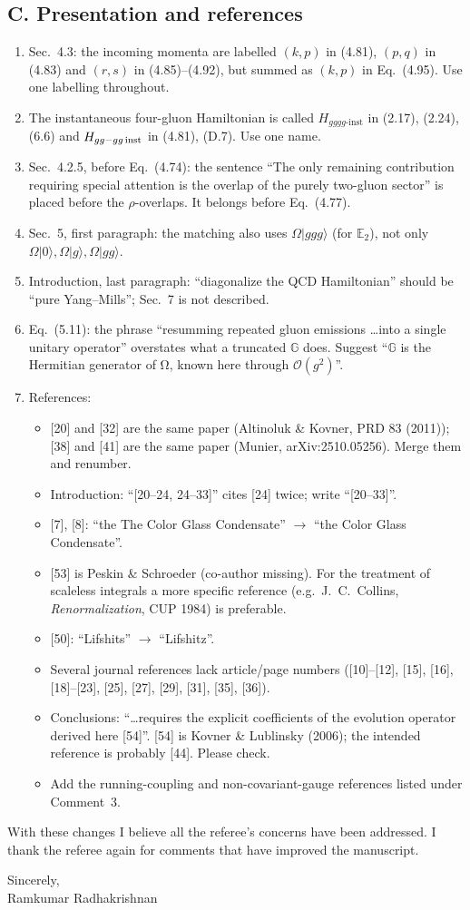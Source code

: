 \documentclass[11pt,a4paper]{article}
\newcommand{\eq}[1]{Eq.~(#1)}
\begin{document}
\subsection*{C. Presentation and references}
\begin{enumerate}[label=\textbf{C\arabic*.},leftmargin=26pt,itemsep=3pt]
\item Sec.~4.3: the incoming momenta are labelled $(k,p)$ in (4.81), $(p,q)$ in (4.83) and $(r,s)$ in (4.85)--(4.92), but summed as $(k,p)$ in \eq{4.95}. Use one labelling throughout.
\item The instantaneous four-gluon Hamiltonian is called $H_{gggg\text{-inst}}$ in (2.17), (2.24), (6.6) and $H_{gg-gg\,\rm inst}$ in (4.81), (D.7). Use one name.
\item Sec.~4.2.5, before \eq{4.74}: the sentence ``The only remaining contribution requiring special attention is the overlap of the purely two-gluon sector'' is placed before the $\rho$-overlaps. It belongs before \eq{4.77}.
\item Sec.~5, first paragraph: the matching also uses $\Omega|ggg\rangle$ (for $\mathbb E_2$), not only $\Omega|0\rangle,\Omega|g\rangle,\Omega|gg\rangle$.
\item Introduction, last paragraph: ``diagonalize the QCD Hamiltonian'' should be ``pure Yang--Mills''; Sec.~7 is not described.
\item \eq{5.11}: the phrase ``resumming repeated gluon emissions \dots into a single unitary operator'' overstates what a truncated $\mathbb G$ does. Suggest ``$\mathbb G$ is the Hermitian generator of Ω, known here through $\mathcal O(g^2)$''.
\item References:
  \begin{itemize}[itemsep=1pt]
  \item{} [20] and [32] are the same paper (Altinoluk \& Kovner, PRD 83 (2011)); [38] and [41] are the same paper (Munier, arXiv:2510.05256). Merge them and renumber.
  \item Introduction: ``[20--24, 24--33]'' cites [24] twice; write ``[20--33]''.
  \item{} [7], [8]: ``the The Color Glass Condensate'' $\to$ ``the Color Glass Condensate''.
  \item{} [53] is Peskin \& Schroeder (co-author missing). For the treatment of scaleless integrals a more specific reference (e.g.\ J.~C.~Collins, \emph{Renormalization}, CUP 1984) is preferable.
  \item{} [50]: ``Lifshits'' $\to$ ``Lifshitz''.
  \item Several journal references lack article/page numbers ([10]--[12], [15], [16], [18]--[23], [25], [27], [29], [31], [35], [36]).
  \item Conclusions: ``\dots requires the explicit coefficients of the evolution operator derived here [54]''. [54] is Kovner \& Lublinsky (2006); the intended reference is probably [44]. Please check.
  \item Add the running-coupling and non-covariant-gauge references listed under Comment~3.
  \end{itemize}
\end{enumerate}

\vspace{6pt}
\noindent With these changes I believe all the referee's concerns have been addressed. I thank the referee again for comments that have improved the manuscript.

\noindent Sincerely,\\ Ramkumar Radhakrishnan

\clearpage

\end{document}
